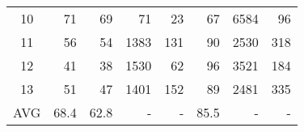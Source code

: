 \begin{table}
{{\begin{tabular}{c|r|r||r||r|r||r|r}
10 & 71 & 69 & 71 & 23 & 67 & 6584 & 96 \\ 

11 & 56 & 54 & 1383 & 131 & 90 & 2530 & 318 \\ 

12 & 41 & 38 & 1530 & 62 & 96 & 3521 & 184 \\ 

13 & 51 & 47 & 1401 & 152 & 89 & 2481 & 335 \\ \hline

AVG& 68.4 & 62.8 & - & - & 85.5 & - & - \\  \hline
          
\hline\end{tabular}\centering
            }
}
\vspace{-0.18in}
\end{table}